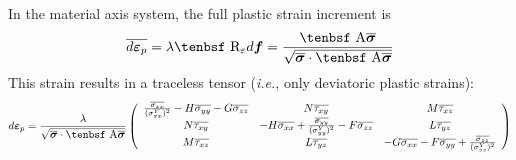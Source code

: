 \documentclass[11pt]{book}
\renewcommand{\vec}[1]{\boldsymbol{#1}}
\def\A{\hbox{\tenbsf A}}
\def\dpl{d \vec{\varepsilon}_{p}}
\def\df{d \vec{f}}
\def\R{\hbox{\tenbsf R}}
\def\s#1{\sigma_{#1}}
\def\t#1{\tau_{#1}}
\begin{document}
In the material axis system, the full plastic strain increment is
\begin{equation}
       \overline{\dpl} = \lambda \R_\varepsilon\df = {\A \overline{\vec\sigma}\over\sqrt{\overline{\vec\sigma} \cdot \A \overline{\vec\sigma}}}
\end{equation}
This strain results in a traceless tensor ({\em i.e.}, only deviatoric plastic strains):
\begin{equation}
         \dpl = {\lambda\over \sqrt{\overline{\vec\sigma} \cdot \A \overline{\vec\sigma}}}
         \left( \begin{array}{ccc}
                      {\overline{\s{xx}}\over (\s{xx}^Y)^2} - H\overline{\s{yy}} - G\overline{\s{zz}} & N\overline{\t{xy}} & M\overline{\t{xz}} \\
                       N\overline{\t{xy}} & -H\overline{\s{xx}} + {\overline{\s{yy}}\over (\s{yy}^Y)^2} - F\overline{\s{zz}} & L\overline{\t{yz}}  \\
                       M\overline{\t{xz}} & L\overline{\t{yz}} & -G\overline{\s{xx}} -F\overline{\s{yy}} +{\overline{\s{zz}}\over (\s{zz}^Y)^2} 
                        \end{array} \right)
\end{equation}
\end{document}
